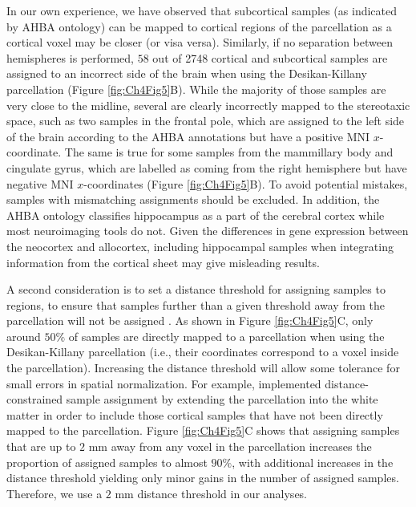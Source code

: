 In our own experience, we have observed that subcortical samples (as indicated by AHBA ontology) can be mapped to cortical regions of the parcellation as a cortical voxel may be closer (or visa versa). Similarly, if no separation between hemispheres is performed, $58$ out of \num{2748} cortical and subcortical samples are assigned to an incorrect side of the brain when using the Desikan-Killany \citep{Desikan2006} parcellation (Figure \ref{fig:Ch4Fig5}B). While the majority of those samples are very close to the midline, several are clearly incorrectly mapped to the stereotaxic space, such as two samples in the frontal pole, which are assigned to the left side of the brain according to the AHBA annotations but have a positive MNI $x$-coordinate. The same is true for some samples from the mammillary body and cingulate gyrus, which are labelled as coming from the right hemisphere but have negative MNI $x$-coordinates (Figure \ref{fig:Ch4Fig5}B). To avoid potential mistakes, samples with mismatching assignments should be excluded. In addition, the AHBA ontology classifies hippocampus as a part of the cerebral cortex while most neuroimaging tools do not. Given the differences in gene expression between the neocortex and allocortex, including hippocampal samples when integrating information from the cortical sheet may give misleading results.

A second consideration is to set a distance threshold for assigning samples to regions, to ensure that samples further than a given threshold away from the parcellation will not be assigned \citep{Romero-Garcia2018}. As shown in Figure \ref{fig:Ch4Fig5}C, only around $50\%$ of samples are directly mapped to a parcellation when using the Desikan-Killany \citep{Desikan2006} parcellation (i.e., their coordinates correspond to a voxel inside the parcellation). Increasing the distance threshold will allow some tolerance for small errors in spatial normalization. For example, \citet{Romero-Garcia2018} implemented distance-constrained sample assignment by extending the parcellation into the white matter in order to include those cortical samples that have not been directly mapped to the parcellation. Figure \ref{fig:Ch4Fig5}C shows that assigning samples that are up to $2$ mm away from any voxel in the parcellation increases the proportion of assigned samples to almost $90\%$, with additional increases in the distance threshold yielding only minor gains in the number of assigned samples. Therefore, we use a $2$ mm distance threshold in our analyses.

